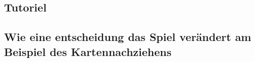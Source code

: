 \subsection{Tutoriel}\label{subsec:placementMatters}



%


\subsection{Wie eine entscheidung das Spiel verändert am Beispiel des Kartennachziehens}\label{subsec:placementMatters}


\renewcommand{\kapitelautor}{}
